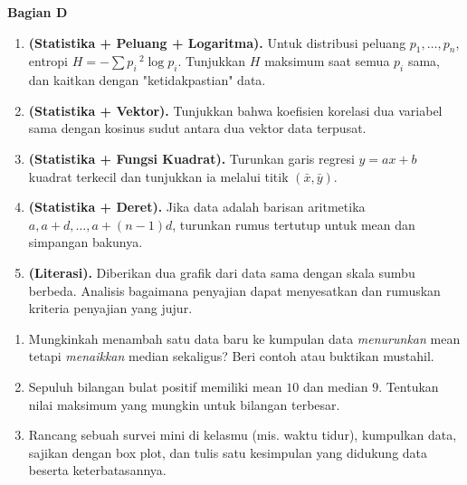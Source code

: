 \documentclass[11pt,a4paper]{report}
\theoremstyle{gaya}
\newcommand{\bagiansoal}[2]{%
  \par\medskip\noindent
  {\large\bfseries\color{biru}Bagian #1}\par\smallskip
  \addcontentsline{toc}{subsection}{Bagian #1}}
\begin{document}
\bagiansoal{D}{Expert (setara tahun pertama universitas --- sintesis antarbab)}
\begin{enumerate}[leftmargin=*]
  \item \textbf{(Statistika + Peluang + Logaritma).} Untuk distribusi peluang $p_1,\dots,p_n$, entropi $H=-\sum p_i\,{}^2\!\log p_i$. Tunjukkan $H$ maksimum saat semua $p_i$ sama, dan kaitkan dengan "ketidakpastian" data.
  \item \textbf{(Statistika + Vektor).} Tunjukkan bahwa koefisien korelasi dua variabel sama dengan kosinus sudut antara dua vektor data terpusat.
  \item \textbf{(Statistika + Fungsi Kuadrat).} Turunkan garis regresi $y=ax+b$ kuadrat terkecil dan tunjukkan ia melalui titik $(\bar x,\bar y)$.
  \item \textbf{(Statistika + Deret).} Jika data adalah barisan aritmetika $a, a+d,\dots,a+(n-1)d$, turunkan rumus tertutup untuk mean dan simpangan bakunya.
  \item \textbf{(Literasi).} Diberikan dua grafik dari data sama dengan skala sumbu berbeda. Analisis bagaimana penyajian dapat menyesatkan dan rumuskan kriteria penyajian yang jujur.
\end{enumerate}

\begin{challenge}
\begin{enumerate}[leftmargin=*,topsep=2pt]
  \item Mungkinkah menambah satu data baru ke kumpulan data \emph{menurunkan} mean tetapi \emph{menaikkan} median sekaligus? Beri contoh atau buktikan mustahil.
  \item Sepuluh bilangan bulat positif memiliki mean $10$ dan median $9$. Tentukan nilai maksimum yang mungkin untuk bilangan terbesar.
  \item Rancang sebuah survei mini di kelasmu (mis. waktu tidur), kumpulkan data, sajikan dengan box plot, dan tulis satu kesimpulan yang didukung data beserta keterbatasannya.
\end{enumerate}
\end{challenge}

\end{document}
